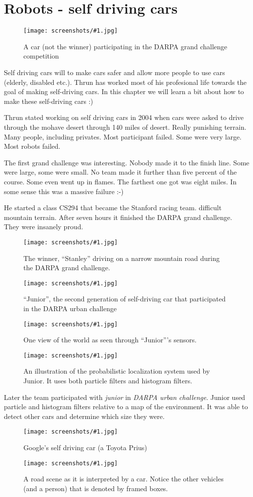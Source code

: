 \documentclass[a4, 12pt, english, USenglish]{scrreprt}
\newcommand{\screenshot}[2]{
\begin{figure}[htb]
\texttt{[image: screenshots/\#1.jpg]}
\label{#1}
\caption{#2}
\end{figure}}
\newcommand{\idx}[1]{{\em #1}\index{#1}}
\begin{document}
\chapter{Robots - self driving cars}

\screenshot{darpachallenge}{A car (not the winner) participating in
  the DARPA grand challenge competition}

Self driving cars will to make cars safer and allow more people to use
cars (elderly, disabled etc.).  Thrun has worked most of his
profesional life towards the goal of making self-driving cars.  In
this chapter we will learn a bit about how to make these self-driving
cars :)

Thrun stated working on self driving cars in 2004 when cars were asked
to drive through the mohave desert through 140 miles of desert.
Really punishing terrain.  Many people, including privates.   Most
participant failed.  Some were very large.  Most robots failed.

The first grand challenge was interesting.  Nobody made it to the
finish line.   Some were large, some were small.  No team made it
further than five percent of the course.  Some even went up in flames.
 The farthest one got was eight miles.  In some sense this was a
 massive failure :-)

He started  a class CS294 that became the Stanford racing team.
difficult mountain terrain.  After seven hours it finished the DARPA
grand challenge.  They were insanely proud.

\screenshot{mountainterrain}{The winner, ``Stanley'' driving on a
  narrow mountain road during the DARPA grand challenge.}

\screenshot{junior}{``Junior'', the second generation of self-driving
  car that participated in the DARPA urban challenge}

\screenshot{juniorsensors}{One view of the world as seen through
  ``Junior'''s sensors.}

\screenshot{juniorprobabilisticlocalization}{An illustration of the
  probabilistic localization system used by Junior.  It uses both
  particle filters and histogram filters.}

Later the team participated with \idx{junior} in \idx{DARPA urban
  challenge}.  Junior used particle and histogram filters relative to
a map of the environment.  It was able to detect other cars and
determine which size they were.

\screenshot{googleselfdrivingcar}{Google's self driving car (a Toyota Prius)}
\screenshot{sceneinterpretationforcar}{A road scene as it is
  interpreted by a car.  Notice the other vehicles (and a person) that
  is denoted by framed boxes. }
\end{document}
